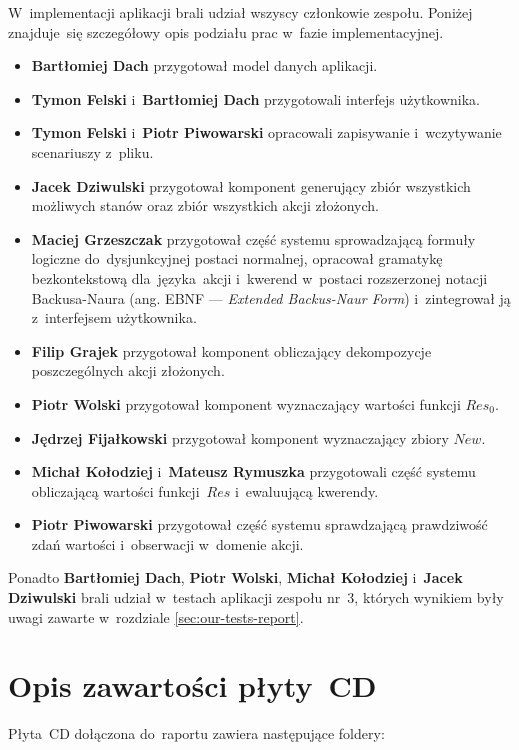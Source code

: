 \documentclass[11pt,a4paper]{article}
\begin{document}
W~implementacji aplikacji brali udział wszyscy członkowie zespołu.
Poniżej znajduje~się szczegółowy opis podziału prac w~fazie implementacyjnej.

\begin{itemize}
    \item \textbf{Bartłomiej Dach} przygotował model danych aplikacji.
    \item \textbf{Tymon Felski} i~\textbf{Bartłomiej Dach} przygotowali interfejs użytkownika.
    \item \textbf{Tymon Felski} i~\textbf{Piotr Piwowarski} opracowali zapisywanie i~wczytywanie scenariuszy z~pliku.
    \item \textbf{Jacek Dziwulski} przygotował komponent generujący zbiór wszystkich możliwych stanów oraz zbiór wszystkich akcji złożonych.
    \item \textbf{Maciej Grzeszczak} przygotował część systemu sprowadzającą formuły logiczne do~dysjunkcyjnej postaci normalnej, opracował gramatykę bezkontekstową dla~języka~akcji i~kwerend w~postaci rozszerzonej notacji Backusa-Naura (ang. EBNF --- \emph{Extended Backus-Naur Form}) i~zintegrował ją z~interfejsem użytkownika.
    \item \textbf{Filip Grajek} przygotował komponent obliczający dekompozycje poszczególnych akcji złożonych.
    \item \textbf{Piotr Wolski} przygotował komponent wyznaczający wartości funkcji ${Res}_0$.
    \item \textbf{Jędrzej Fijałkowski} przygotował komponent wyznaczający zbiory $New$.
    \item \textbf{Michał Kołodziej} i~\textbf{Mateusz Rymuszka} przygotowali część systemu obliczającą wartości funkcji~$Res$ i~ewaluującą kwerendy.
    \item \textbf{Piotr Piwowarski} przygotował część systemu sprawdzającą prawdziwość zdań wartości i~obserwacji w~domenie akcji.
\end{itemize}

Ponadto \textbf{Bartłomiej Dach}, \textbf{Piotr Wolski}, \textbf{Michał Kołodziej} i~\textbf{Jacek Dziwulski} brali udział w~testach aplikacji zespołu nr~3, których wynikiem były uwagi zawarte w~rozdziale \ref{sec:our-tests-report}.

\section{Opis zawartości płyty~CD}

Płyta~CD dołączona do~raportu zawiera następujące foldery:
\end{document}
